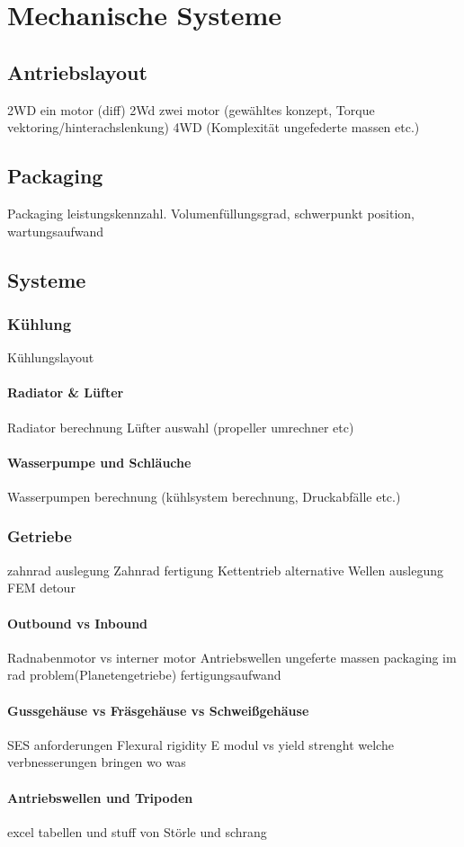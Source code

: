 
\chapter{Mechanische Systeme}

\section{Antriebslayout}
2WD ein motor (diff)
2Wd zwei motor (gewähltes konzept, Torque vektoring/hinterachslenkung)
4WD (Komplexität ungefederte massen etc.)

\section{Packaging}
Packaging leistungskennzahl. Volumenfüllungsgrad, schwerpunkt position, wartungsaufwand

\section{Systeme}

\subsection{Kühlung}
Kühlungslayout

\subsubsection{Radiator \& Lüfter}
Radiator berechnung
Lüfter auswahl (propeller umrechner etc)

\subsubsection{Wasserpumpe und Schläuche}
Wasserpumpen berechnung (kühlsystem berechnung, Druckabfälle etc.)

\subsection{Getriebe}
zahnrad auslegung
Zahnrad fertigung
Kettentrieb alternative
Wellen auslegung
FEM detour

\subsubsection{Outbound vs Inbound}
Radnabenmotor vs interner motor
Antriebswellen
ungeferte massen
packaging im rad problem(Planetengetriebe) fertigungsaufwand

\subsubsection{Gussgehäuse vs Fräsgehäuse vs Schweißgehäuse}
SES anforderungen
Flexural rigidity
E modul vs yield strenght welche verbnesserungen bringen wo was


\subsubsection{Antriebswellen und Tripoden}
excel tabellen und stuff von Störle und schrang